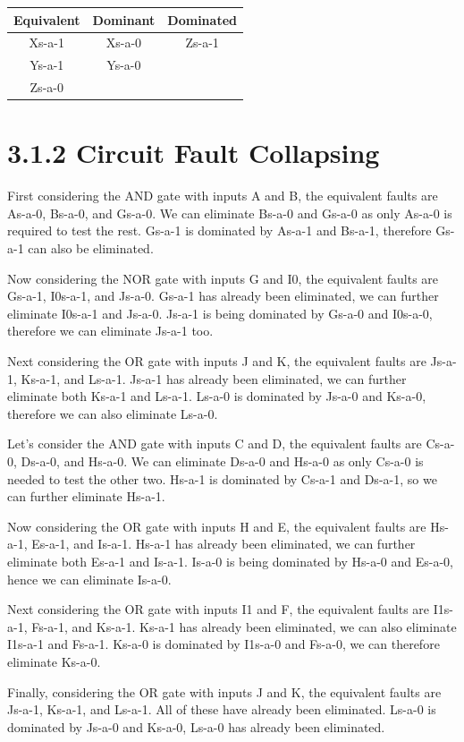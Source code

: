 \documentclass[11pt]{report}
\begin{document}
\begin{tabular}{ |c|c|c| }
\hline
Equivalent & Dominant & Dominated
\\ 
\hline
\hline
Xs-a-1 & Xs-a-0 & Zs-a-1
\\  
\hline
Ys-a-1 & Ys-a-0 & 
\\
\hline
Zs-a-0 & & 
\\
\hline
\end{tabular}



\section*{3.1.2 Circuit Fault Collapsing}
First considering the AND gate with inputs A and B, the equivalent faults
are As-a-0, Bs-a-0, and Gs-a-0. We can eliminate Bs-a-0 and Gs-a-0 as
only As-a-0 is required to test the rest. Gs-a-1 is dominated by As-a-1
and Bs-a-1, therefore Gs-a-1 can also be eliminated.

Now considering the NOR gate with inputs G and I0, the equivalent faults
are Gs-a-1, I0s-a-1, and Js-a-0. Gs-a-1 has already been eliminated, we can
further eliminate I0s-a-1 and Js-a-0. Js-a-1 is being dominated by Gs-a-0 and
I0s-a-0, therefore we can eliminate Js-a-1 too.

Next considering the OR gate with inputs J and K, the equivalent faults
are Js-a-1, Ks-a-1, and Ls-a-1. Js-a-1 has already been eliminated, we can
further eliminate both Ks-a-1 and Ls-a-1. Ls-a-0 is dominated by Js-a-0 and
Ks-a-0, therefore we can also eliminate Ls-a-0.

Let's consider the AND gate with inputs C and D, the equivalent faults are
Cs-a-0, Ds-a-0, and Hs-a-0. We can eliminate Ds-a-0 and Hs-a-0 as only Cs-a-0
is needed to test the other two. Hs-a-1 is dominated by Cs-a-1 and Ds-a-1, so
we can further eliminate Hs-a-1.

Now considering the OR gate with inputs H and E, the equivalent faults are
Hs-a-1, Es-a-1, and Is-a-1. Hs-a-1 has already been eliminated, we can further
eliminate both Es-a-1 and Is-a-1. Is-a-0 is being dominated by Hs-a-0 and
Es-a-0, hence we can eliminate Is-a-0.

Next considering the OR gate with inputs I1 and F, the equivalent faults are
I1s-a-1, Fs-a-1, and Ks-a-1. Ks-a-1 has already been eliminated, we can also
eliminate I1s-a-1 and Fs-a-1. Ks-a-0 is dominated by I1s-a-0 and Fs-a-0, we
can therefore eliminate Ks-a-0.

Finally, considering the OR gate with inputs J and K, the equivalent faults
are Js-a-1, Ks-a-1, and Ls-a-1. All of these have already been eliminated.
Ls-a-0 is dominated by Js-a-0 and Ks-a-0, Ls-a-0 has already been eliminated.
\end{document}
